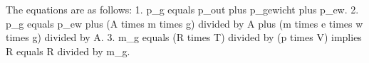 The equations are as follows:
1. p_g equals p_out plus p_gewicht plus p_ew.
2. p_g equals p_ew plus (A times m times g) divided by A plus (m times e times w times g) divided by A.
3. m_g equals (R times T) divided by (p times V) implies R equals R divided by m_g.